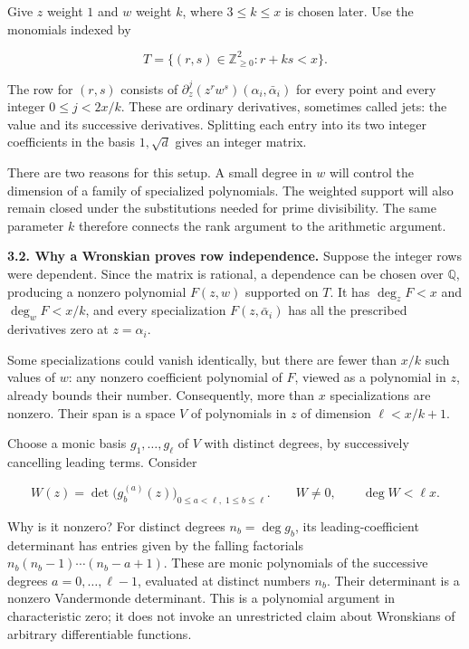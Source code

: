 \documentclass[11pt]{article}
\begin{document}
Give \(z\) weight \(1\) and \(w\) weight \(k\), where \(3\le k\le x\) is chosen later. Use the monomials indexed by

\[
T=\{(r,s)\in\mathbb Z_{\ge0}^2:r+ks<x\}.
\]

The row for \((r,s)\) consists of \(\partial_z^j(z^rw^s)(\alpha_i,\bar\alpha_i)\) for every point and every integer \(0\le j<2x/k\). These are ordinary derivatives, sometimes called jets: the value and its successive derivatives. Splitting each entry into its two integer coefficients in the basis \(1,\sqrt d\) gives an integer matrix.

There are two reasons for this setup. A small degree in \(w\) will control the dimension of a family of specialized polynomials. The weighted support will also remain closed under the substitutions needed for prime divisibility. The same parameter \(k\) therefore connects the rank argument to the arithmetic argument.

\textbf{3.2. Why a Wronskian proves row independence.} Suppose the integer rows were dependent. Since the matrix is rational, a dependence can be chosen over \(\mathbb Q\), producing a nonzero polynomial \(F(z,w)\) supported on \(T\). It has \(\deg_zF<x\) and \(\deg_wF<x/k\), and every specialization \(F(z,\bar\alpha_i)\) has all the prescribed derivatives zero at \(z=\alpha_i\).

Some specializations could vanish identically, but there are fewer than \(x/k\) such values of \(w\): any nonzero coefficient polynomial of \(F\), viewed as a polynomial in \(z\), already bounds their number. Consequently, more than \(x\) specializations are nonzero. Their span is a space \(V\) of polynomials in \(z\) of dimension \(\ell<x/k+1\).

Choose a monic basis \(g_1,\ldots,g_\ell\) of \(V\) with distinct degrees, by successively cancelling leading terms. Consider

\[
W(z)=\det\bigl(g_b^{(a)}(z)\bigr)_{
0\le a<\ell,\;1\le b\le\ell}.
\qquad W\ne0,\qquad \deg W<\ell x.
\tag{2}
\]

Why is it nonzero? For distinct degrees \(n_b=\deg g_b\), its leading-coefficient determinant has entries given by the falling factorials \(n_b(n_b-1)\cdots(n_b-a+1)\). These are monic polynomials of the successive degrees \(a=0,\ldots,\ell-1\), evaluated at distinct numbers \(n_b\). Their determinant is a nonzero Vandermonde determinant. This is a polynomial argument in characteristic zero; it does not invoke an unrestricted claim about Wronskians of arbitrary differentiable functions.
\end{document}
